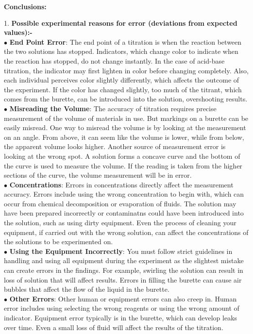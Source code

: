 \documentclass[12pt]{article}
\begin{document}
	\pagebreak
	
	{\Large\textbf{Conclusions: }}
	
	1. \textbf{Possible experimental reasons for error (deviations from expected values):-} \\
	$\bullet$ \textbf{End Point Error}: The end point of a titration is when the reaction between the two solutions has stopped. Indicators, which change color to indicate when the reaction has stopped, do not change instantly. In the case of acid-base titration, the indicator may first lighten in color before changing completely. Also, each individual perceives color slightly differently, which affects the outcome of the experiment. If the color has changed slightly, too much of the titrant, which comes from the burette, can be introduced into the solution, overshooting results.\\
	$\bullet$ \textbf{Misreading the Volume}: The accuracy of titration requires precise measurement of the volume of materials in use. But markings on a burette can be easily misread. One way to misread the volume is by looking at the measurement on an angle. From above, it can seem like the volume is lower, while from below, the apparent volume looks higher. Another source of measurement error is looking at the wrong spot. A solution forms a concave curve and the bottom of the curve is used to measure the volume. If the reading is taken from the higher sections of the curve, the volume measurement will be in error.\\
	$\bullet$ \textbf{Concentrations}: Errors in concentrations directly affect the measurement accuracy. Errors include using the wrong concentration to begin with, which can occur from chemical decomposition or evaporation of fluids. The solution may have been prepared incorrectly or contaminatns could have been introduced into the solution, such as using dirty equipment. Even the process of cleaning your equipment, if carried out with the wrong solution, can affect the concentrations of the solutions to be experimented on.\\
	$\bullet$ \textbf{Using the Equipment Incorrectly}: You must follow strict guidelines in handling and using all equipment during the experiment as the slightest mistake can create errors in the findings. For example, swirling the solution can result in loss of solution that will affect results. Errors in filling the burette can cause air bubbles that affect the flow of the liquid in the burette.\\
	$\bullet$ \textbf{Other Errors}: Other human or equipment errors can also creep in. Human error includes using selecting the wrong reagents or using the wrong amount of indicator. Equipment error typically is in the burette, which can develop leaks over time. Even a small loss of fluid will affect the results of the titration.\\
\end{document}
